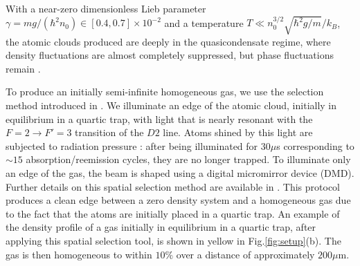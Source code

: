 \documentclass[submission, Phys]{SciPost}
\begin{document}

With a near-zero dimensionless Lieb parameter $\gamma =  mg / (\hbar^2 n_0) \in [0.4,0.7] \times 10^{-2}$ and a temperature $ T \ll n_0^{3/2} \sqrt{\hbar^2 g /m}/k_B$, the atomic clouds produced are deeply in the quasicondensate regime, where density fluctuations are almost completely suppressed, but phase fluctuations remain \cite{PhysRevLett.91.040403}.


To produce an initially semi-infinite homogeneous gas, we use the selection method introduced in \cite{PhysRevLett.133.113402}. We illuminate an edge of the atomic cloud, initially in equilibrium in a quartic trap, with light that is nearly resonant with the $F=2 \to F' = 3$ transition of the $D2$ line. Atoms shined by this light are subjected to radiation pressure : after being illuminated for $30 \mu$s corresponding to $\sim 15$ absorption/reemission cycles, they are no longer trapped. To illuminate only an edge of the gas, the beam is shaped using a digital micromirror device (DMD). Further details on this spatial selection method are available in \cite{PhysRevLett.133.113402}. This protocol produces a clean edge between a zero density system and a homogeneous gas due to the fact that the atoms are initially placed in a quartic trap. An example of the density profile of a gas initially in equilibrium in a quartic trap, after applying this spatial selection tool, is shown in yellow in Fig.\ref{fig:setup}(b). The gas is then homogeneous to within $10 \%$ over a distance of approximately $200 \mu$m. 
\end{document}
